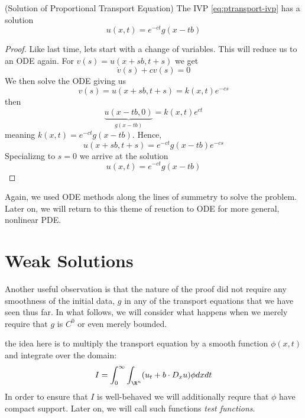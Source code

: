 \documentclass{bkcnotes}
\begin{document}
\begin{nthm}(Solution of Proportional Transport Equation)
  The IVP \eqref{eq:ptransport-ivp} has a solution
  \begin{equation}
    \label{eq:ptransport-sol}
    u(x,t) = e^{-ct}g(x-tb)
  \end{equation}
\end{nthm}
\begin{proof}
  Like last time, lets start with a change of variables. This will
  reduce us to an ODE again. For $v(s) = u(x+sb,t+s)$ we get
  \begin{equation}
    \label{eq:trans-ode}
    \dot{v}(s) + cv(s) = 0
  \end{equation}
  We then solve the ODE giving us
  \begin{equation}
    \label{eq:ode-sol}
    v(s) = u(x+sb,t+s) = k(x,t)e^{-cs}
  \end{equation}
  then
  \begin{equation}
    \label{eq:u-sol}
    \underbrace{u(x-tb,0)}_{g(x-tb)} = k(x,t)e^{ct}
  \end{equation}
  meaning $k(x,t) = e^{-ct}g(x-tb)$. Hence,
  \begin{equation}
    \label{eq:u-sol}
    u(x+sb,t+s) = e^{-ct}g(x-tb)e^{-cs}
  \end{equation}
  Specializng to $s=0$ we arrive at the solution
  \begin{equation}
    \label{eq:ptransport-sol}
    u(x,t) = e^{-ct}g(x-tb)
  \end{equation}
\end{proof}
Again, we used ODE methods along the lines of summetry to solve the
problem. Later on, we will return to this theme of reuction to ODE for
more general, nonlinear PDE.

\section{Weak Solutions}
Another useful observation is that the nature of the proof did not
require any smoothness of the initial data, $g$ in any of the
transport equations that we have seen thus far. In what follows, we
will consider what happens when we merely require that $g$ is $C^0$ or
even merely bounded.

the idea here is to multiply the transport equation by a smooth
function $\phi(x,t)$ and integrate over the domain:
\begin{equation}
  \label{eq:i}
  I = \int_0^\infty\int_{\R^n} (u_t + b\cdot D_xu)\phi dxdt
\end{equation}
In order to ensure that $I$ is well-behaved we will additionally
requre that $\phi$ have compact support. Later on, we will call such
functions \emph{test functions}.
\end{document}
